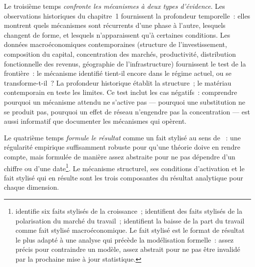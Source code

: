 Le troisième temps \emph{confronte les mécanismes à deux types d'évidence}. Les observations historiques du chapitre~1 fournissent la profondeur temporelle~: elles montrent quels mécanismes sont récurrents d'une phase à l'autre, lesquels changent de forme, et lesquels n'apparaissent qu'à certaines conditions. Les données macroéconomiques contemporaines (structure de l'investissement, composition du capital, concentration des marchés, productivité, distribution fonctionnelle des revenus, géographie de l'infrastructure) fournissent le test de la frontière~: le mécanisme identifié tient-il encore dans le régime actuel, ou se transforme-t-il~? La profondeur historique établit la structure~; le matériau contemporain en teste les limites. Ce test inclut les cas négatifs~: comprendre pourquoi un mécanisme attendu ne s'active pas --- pourquoi une substitution ne se produit pas, pourquoi un effet de réseau n'engendre pas la concentration --- est aussi informatif que documenter les mécanismes qui opèrent.

Le quatrième temps \emph{formule le résultat} comme un fait stylisé au sens de \textcite{kaldor_capital_1961}~: une régularité empirique suffisamment robuste pour qu'une théorie doive en rendre compte, mais formulée de manière assez abstraite pour ne pas dépendre d'un chiffre ou d'une date\footnote{\textcite{kaldor_capital_1961} identifie six faits stylisés de la croissance~; \textcite{autor_dorn_2013} identifient des faits stylisés de la polarisation du marché du travail~; \textcite{karabarbounis_neiman_2014} identifient la baisse de la part du travail comme fait stylisé macroéconomique. Le fait stylisé est le format de résultat le plus adapté à une analyse qui précède la modélisation formelle~: assez précis pour contraindre un modèle, assez abstrait pour ne pas être invalidé par la prochaine mise à jour statistique.}. Le mécanisme structurel, ses conditions d'activation et le fait stylisé qui en résulte sont les trois composantes du résultat analytique pour chaque dimension.

